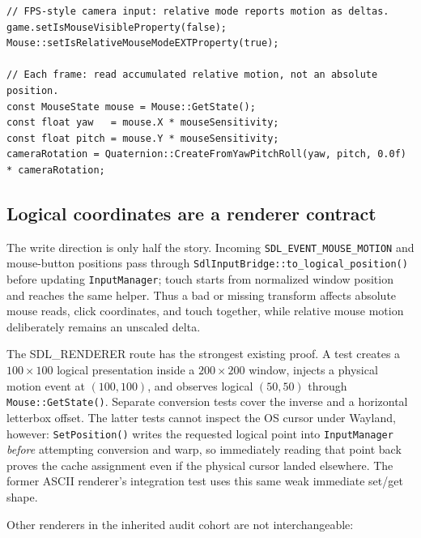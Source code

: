 \begin{lstlisting}
// FPS-style camera input: relative mode reports motion as deltas.
game.setIsMouseVisibleProperty(false);
Mouse::setIsRelativeMouseModeEXTProperty(true);

// Each frame: read accumulated relative motion, not an absolute position.
const MouseState mouse = Mouse::GetState();
const float yaw   = mouse.X * mouseSensitivity;
const float pitch = mouse.Y * mouseSensitivity;
cameraRotation = Quaternion::CreateFromYawPitchRoll(yaw, pitch, 0.0f) * cameraRotation;
\end{lstlisting}

\subsection{Logical coordinates are a renderer contract}
\label{sec:input-logical-coordinate-routing}

The write direction is only half the story. Incoming
\texttt{SDL\_EVENT\_MOUSE\_MOTION} and mouse-button positions pass through
\texttt{SdlInputBridge::to\_logical\_position()} before updating
\texttt{InputManager}; touch starts from normalized window position and reaches the same
helper. Thus a bad or missing transform affects absolute mouse reads, click coordinates, and
touch together, while relative mouse motion deliberately remains an unscaled delta.

The SDL\_RENDERER route has the strongest existing proof. A test creates a
$100\times100$ logical presentation inside a $200\times200$ window, injects a physical motion
event at $(100,100)$, and observes logical $(50,50)$ through
\texttt{Mouse::GetState()}. Separate conversion tests cover the inverse and a horizontal
letterbox offset. The latter tests cannot inspect the OS cursor under Wayland, however:
\texttt{SetPosition()} writes the requested logical point into \texttt{InputManager}
\emph{before} attempting conversion and warp, so immediately reading that point back proves
the cache assignment even if the physical cursor landed elsewhere. The former ASCII renderer's integration
test uses this same weak immediate set/get shape.

Other renderers in the inherited audit cohort are not interchangeable:

